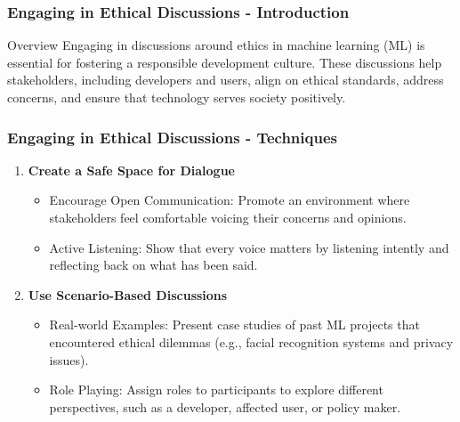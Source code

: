 \documentclass[aspectratio=169]{beamer}
\begin{document}
\begin{frame}[fragile]
    \frametitle{Engaging in Ethical Discussions - Introduction}
    \begin{block}{Overview}
        Engaging in discussions around ethics in machine learning (ML) is essential for fostering a responsible development culture. These discussions help stakeholders, including developers and users, align on ethical standards, address concerns, and ensure that technology serves society positively.
    \end{block}
\end{frame}

\begin{frame}[fragile]
    \frametitle{Engaging in Ethical Discussions - Techniques}
    \begin{enumerate}
        \item \textbf{Create a Safe Space for Dialogue}
            \begin{itemize}
                \item Encourage Open Communication: Promote an environment where stakeholders feel comfortable voicing their concerns and opinions.
                \item Active Listening: Show that every voice matters by listening intently and reflecting back on what has been said.
            \end{itemize}
        
        \item \textbf{Use Scenario-Based Discussions}
            \begin{itemize}
                \item Real-world Examples: Present case studies of past ML projects that encountered ethical dilemmas (e.g., facial recognition systems and privacy issues).
                \item Role Playing: Assign roles to participants to explore different perspectives, such as a developer, affected user, or policy maker.
            \end{itemize}
    \end{enumerate}
\end{frame}
\end{document}
